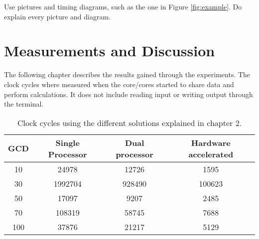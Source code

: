 \documentclass[11pt]{article}
\begin{document}
Use pictures and timing diagrams, such as the one in Figure \ref{fig:example}. Do explain every picture and diagram.


\section{Measurements and Discussion\label{sec:measurements}}
The following chapter describes the results gained through the experiments. The clock cycles where measured when the core/cores started to share data and perform calculations. It does not include reading input or writing output through the terminal.

\begin{table}[htbp]
   \centering
   \begin{tabular}{@{} cccc @{}} %
      \toprule
      \cmidrule(r){1-2} %
	GCD	& Single Processor	& Dual processor	& Hardware accelerated\\
      \midrule
      10	& 24978			& 12726			&1595\\
      30	& 1992704		&  928490		&100623\\
      50	& 17097			& 9207			&2485\\
      70	& 108319		& 58745			&7688\\
     100	& 37876			&  21217		&5129\\
      \bottomrule
   \end{tabular}
   \caption{Clock cycles using the different solutions explained in chapter 2.}
   \label{tab:Clockcycles}
\end{table}
\end{document}
